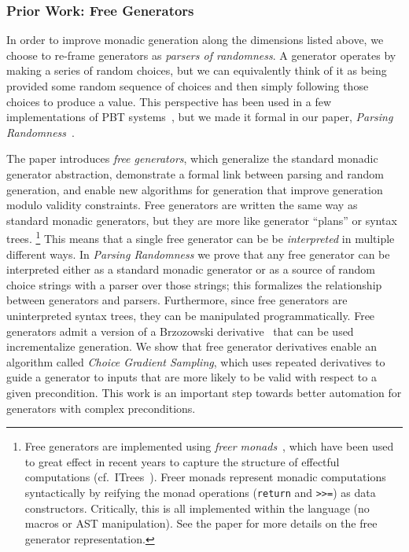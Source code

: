 \subsubsection{Prior Work: Free Generators}
In order to improve monadic generation along the dimensions listed above, we
choose to re-frame generators as {\em parsers of randomness}. A generator
operates by making a series of random choices, but we can equivalently think of
it as being provided some random sequence of choices and then simply following
those choices to produce a value. This perspective has been used in a few
implementations of PBT systems~\cite{maciver2019hypothesis,dolan2017testing},
but we made it formal in our paper, {\em Parsing
Randomness}~\cite{goldstein2022parsing}.

The paper introduces {\em free generators}, which generalize the standard
monadic generator abstraction, demonstrate a formal link between parsing and
random generation, and enable new algorithms for generation that improve
generation modulo validity constraints. Free generators are written the same
way as standard monadic generators, but they are more like generator ``plans''
or syntax trees.%
\footnote{Free generators are implemented using {\em freer
monads}~\cite{kiselyov2015freer}, which have been used to great effect in recent
years to capture the structure of effectful computations
(cf.~ITrees~\cite{old:xia2019interaction}). Freer monads represent
monadic computations syntactically by reifying the monad operations
(\lstinline{return} and \lstinline{>>=}) as data constructors. Critically, this
is all implemented within the language (no macros or AST manipulation). See the
paper for more details on the free generator representation.}
This means that a single free generator can be be {\em interpreted} in multiple
different ways. In {\em Parsing Randomness} we prove that any free generator can
be interpreted either as a standard monadic generator or as a source of
random choice strings with a parser over those strings; this formalizes the
relationship between generators and parsers. Furthermore, since free generators
are uninterpreted syntax trees, they can be manipulated programmatically. Free
generators admit a version of a Brzozowski
derivative~\cite{brzozowski1964derivatives} that can be used incrementalize
generation. We show that free generator derivatives enable an algorithm called
{\em Choice Gradient Sampling}, which uses repeated derivatives to guide a
generator to inputs that are more likely to be valid with respect to a given
precondition. This work is an important step towards better automation for
generators with complex preconditions.


